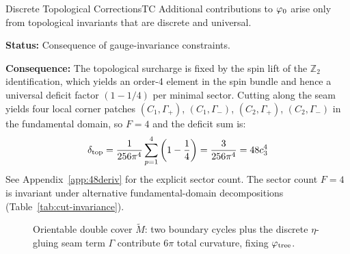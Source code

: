 \begin{axiom}{Discrete Topological Corrections}{TC}
Additional contributions to $\varphi_0$ arise only from topological invariants 
that are discrete and universal.

\tcblower
\textbf{Status:} Consequence of gauge-invariance constraints.

\textbf{Consequence:} The topological surcharge is fixed by the spin lift of the
$\mathbb{Z}_2$ identification, which yields an order-4 element in the spin bundle
and hence a universal deficit factor $(1-1/4)$ per minimal sector. Cutting along the
seam yields four local corner patches $(C_1,\Gamma_+)$, $(C_1,\Gamma_-)$, $(C_2,\Gamma_+)$,
$(C_2,\Gamma_-)$ in the fundamental domain, so $F=4$ and the deficit sum is:
\begin{equation}
    \delta_{\mathrm{top}} 
    = \frac{1}{256\pi^4}\sum_{p=1}^{4}\left(1-\frac{1}{4}\right)
    = \frac{3}{256\pi^4}
    = 48c_3^4
\end{equation}
See Appendix~\ref{app:48deriv} for the explicit sector count.
The sector count $F=4$ is invariant under alternative fundamental-domain
decompositions (Table~\ref{tab:cut-invariance}).
\end{axiom}

\begin{figure}[H]
\centering
{}
\caption{Orientable double cover $\widetilde{M}$: two boundary cycles plus the discrete
$\eta$-gluing seam term $\Gamma$ contribute $6\pi$ total curvature, fixing $\varphi_{\mathrm{tree}}$.}
\label{fig:doublecover}
\end{figure}

